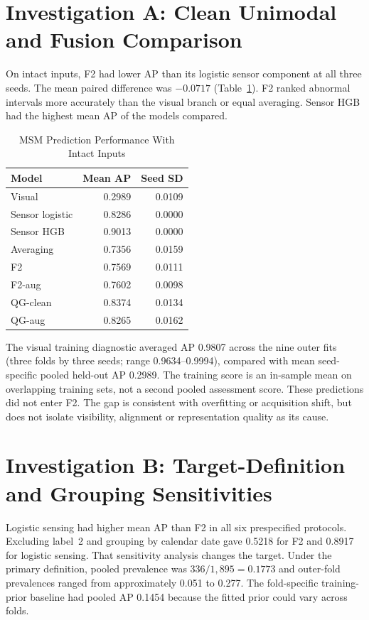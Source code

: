 \section{Investigation A: Clean Unimodal and Fusion Comparison}
\label{sec:msm-clean}
On intact inputs, F2 had lower AP than its logistic sensor component at all three seeds.
The mean paired difference was $-0.0717$ (Table~\ref{tab:msm-clean}). F2 ranked
abnormal intervals more accurately than the visual branch or equal averaging. Sensor HGB
had the highest mean AP of the models compared.

\begin{table}[htbp]
\caption{MSM Prediction Performance With Intact Inputs}\label{tab:msm-clean}
\centering\small

\begin{tabular}{lrr}\hline Model&Mean AP&Seed SD\\\hline
Visual&0.2989&0.0109\\
Sensor logistic&0.8286&0.0000\\
Sensor HGB&0.9013&0.0000\\
Averaging&0.7356&0.0159\\
F2&0.7569&0.0111\\
F2-aug&0.7602&0.0098\\
QG-clean&0.8374&0.0134\\
QG-aug&0.8265&0.0162\\\hline
\end{tabular}
\end{table}

The visual training diagnostic averaged AP 0.9807 across the nine outer fits
(three folds by three seeds; range 0.9634--0.9994), compared with mean seed-specific
pooled held-out AP 0.2989. The training score is an in-sample mean on overlapping training
sets, not a second pooled assessment score. These predictions did not enter F2.
The gap is consistent with overfitting or acquisition shift, but does not isolate
visibility, alignment or representation quality as its cause.

\section{Investigation B: Target-Definition and Grouping Sensitivities}
Logistic sensing had higher mean AP than F2 in all six prespecified protocols. Excluding
label~2 and grouping by calendar date gave 0.5218 for F2 and 0.8917 for logistic
sensing. That sensitivity analysis changes the target. Under the primary definition,
pooled prevalence was $336/1{,}895=0.1773$ and outer-fold prevalences ranged from
approximately 0.051 to 0.277. The fold-specific training-prior baseline had pooled AP
0.1454 because the fitted prior could vary across folds.


